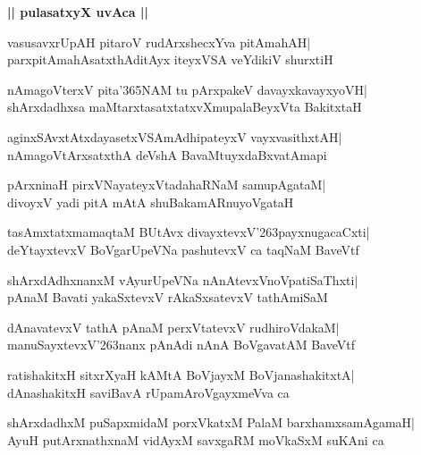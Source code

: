 \documentclass[twoside,12pt,openright]{book}
\def\S{\char'263}
\newcounter{shloka}[chapter]
\def\uvaca#1{\centerline{{\large\textbf{#1}}}}
\begin{document}
\uvaca{|| pulasatxyX uvAca ||}
\begin{shloka}%
vasusavxrUpAH pitaroV rudArxshecxYva pitAmahAH|\\
parxpitAmahAsatxthAditAyx iteyxVSA veYdikiV shurxtiH
\end{shloka}

\begin{shloka}%
nAmagoVterxV pita\char'365NAM tu pArxpakeV davayxkavayxyoVH|\\
shArxdadhxsa maMtarxtasatxtatxvXmupalaBeyxVta BakitxtaH
\end{shloka}

\begin{shloka}%
aginxSAvxtAtxdayasetxVSAmAdhipateyxV vayxvasithxtAH|\\
nAmagoVtArxsatxthA deVshA BavaMtuyxdaBxvatAmapi
\end{shloka}

\begin{shloka}%
pArxninaH pirxVNayateyxVtadahaRNaM samupAgataM|\\
divoyxV yadi pitA mAtA shuBakamARnuyoVgataH
\end{shloka}

\begin{shloka}%
tasAmxtatxmamaqtaM BUtAvx divayxtevxV\S payxnugacaCxti|\\
deYtayxtevxV BoVgarUpeVNa pashutevxV ca taqNaM BaveVtf
\end{shloka}

\begin{shloka}%
shArxdAdhxnanxM vAyurUpeVNa nAnAtevxVnoVpatiSaThxti|\\
pAnaM Bavati yakaSxtevxV rAkaSxsatevxV tathAmiSaM
\end{shloka}

\begin{shloka}%
dAnavatevxV tathA pAnaM perxVtatevxV rudhiroVdakaM|\\
manuSayxtevxV\S nanx pAnAdi nAnA BoVgavatAM BaveVtf
\end{shloka}

\begin{shloka}%
ratishakitxH sitxrXyaH kAMtA BoVjayxM BoVjanashakitxtA|\\
dAnashakitxH saviBavA rUpamAroVgayxmeVva ca
\end{shloka}

\begin{shloka}%
shArxdadhxM puSapxmidaM porxVkatxM PalaM barxhamxsamAgamaH|\\
AyuH putArxnathxnaM vidAyxM savxgaRM moVkaSxM suKAni ca
\end{shloka}
\end{document}
